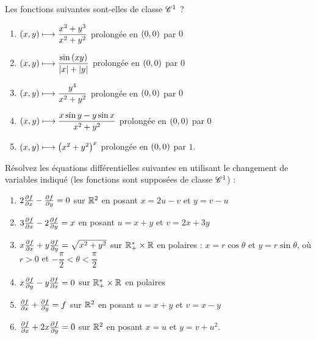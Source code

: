 \begin{exoss}
Les fonctions suivantes sont-elles de classe \(\mathscr{C}^{1}\) ?

\begin{enumerate}
    \item \(\left(x,y\right)\longmapsto\dfrac{x^3+y^3}{x^2+y^2}\) prolongée en \(\left(0,0\right)\) par \(0\) \\
    \item \(\left(x,y\right)\longmapsto\dfrac{\sin\left(xy\right)}{\left\lvert x\right\rvert+\left\lvert y\right\rvert}\) prolongée en \(\left(0,0\right)\) par \(0\) \\
    \item \(\left(x,y\right)\longmapsto\dfrac{y^4}{x^2+y^2}\) prolongée en \(\left(0,0\right)\) par \(0\) \\
    \item \(\left(x,y\right)\longmapsto\dfrac{x\sin y-y\sin x}{x^2+y^2}\) prolongée en \(\left(0,0\right)\) par \(0\) \\
    \item \(\left(x,y\right)\longmapsto\left(x^2+y^2\right)^x\) prolongée en \(\left(0,0\right)\) par \(1\).
\end{enumerate}
\end{exoss}

\begin{exoss}
Résolvez les équations différentielles suivantes en utilisant le changement de variables indiqué (les fonctions sont supposées de classe \(\mathscr{C}^{1}\)) :

\begin{enumerate}
    \item \(2\pdv{f}{x}-\pdv{f}{y}=0\) sur \(\mathbb{R}^2\) en posant \(x=2u-v\) et \(y=v-u\) \\
    \item \(3\pdv{f}{x}-2\pdv{f}{y}=x\) en posant \(u=x+y\) et \(v=2x+3y\) \\
    \item \(x\pdv{f}{x}+y\pdv{f}{y}=\sqrt{x^2+y^2}\) sur \(\mathbb{R}_+^*\times\mathbb{R}\) en polaires : \(x=r\cos\theta\) et \(y=r\sin\theta\), où \(r>0\) et \(-\dfrac{\pi}{2}<\theta<\dfrac{\pi}{2}\) \\
    \item \(x\pdv{f}{y}-y\pdv{f}{x}=0\) sur \(\mathbb{R}_+^*\times\mathbb{R}\) en polaires \\
    \item \(\pdv{f}{x}+\pdv{f}{y}=f\) sur \(\mathbb{R}^2\) en posant \(u=x+y\) et \(v=x-y\) \\
    \item \(\pdv{f}{x}+2x\pdv{f}{y}=0\) sur \(\mathbb{R}^2\) en posant \(x=u\) et \(y=v+u^2\).
\end{enumerate}
\end{exoss}

